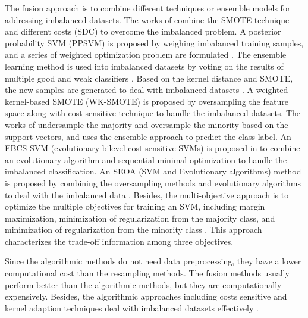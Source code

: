 The fusion approach is to combine different techniques or ensemble models for addressing imbalanced datasets. The works of \cite{SDCs} combine the SMOTE technique and different costs (SDC) to overcome the imbalanced problem. A posterior probability SVM (PPSVM) is proposed by weighing imbalanced training samples, and a series of weighted optimization problem are formulated \cite{article_ppsvm}. The ensemble learning method is used into imbalanced datasets by voting on the results of multiple good and weak classifiers \cite{ZHANG2016251}. Based on the kernel distance and SMOTE, the new samples are generated to deal with imbalanced datasets \cite{GUO2024110986}. A weighted kernel-based SMOTE (WK-SMOTE) \cite{wk-smote} is proposed by oversampling the feature space along with cost sensitive technique to handle the imbalanced datasets. The works of \cite{2016A} undersample the majority and oversample the minority based on the support vectors, and uses the ensemble approach to predict the class label. An EBCS-SVM (evolutionary bilevel cost-sensitive SVMs) is proposed in \cite{rosales2022handling} to combine an evolutionary algorithm and sequential minimal optimization to handle the imbalanced classification. An SEOA (SVM and Evolutionary algorithms) method is proposed by combining the oversampling methods and evolutionary algorithms to deal with the imbalanced data \cite{evolutionary2024}. Besides, the multi-objective approach is to optimize the multiple objectives for training an SVM, including margin maximization, minimization of regularization from the majority class, and minimization of regularization from the minority class \cite{2014multiobjSVM} \cite{2019Multiobjective}. This approach characterizes the trade-off information among three objectives. 

Since the algorithmic methods do not need data preprocessing, they have a lower computational cost than the resampling methods. The fusion methods usually perform better than the algorithmic methods, but they are computationally expensively. Besides, the algorithmic approaches including costs sensitive and kernel adaption techniques deal with imbalanced datasets effectively \cite{Review2024}.
~\\

